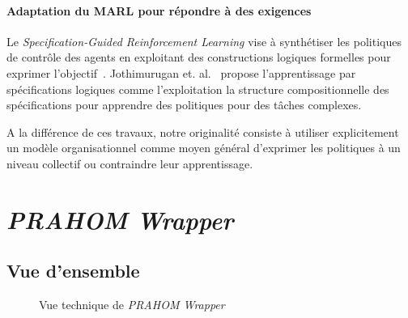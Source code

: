 \documentclass[demonstration]{jfsma}
\begin{document}
\paragraph{\textbf{Adaptation du MARL pour répondre à des exigences}}
%
%
Le \emph{Specification-Guided Reinforcement Learning} vise à synthétiser les politiques de contrôle des agents en exploitant des constructions logiques formelles pour exprimer l'objectif~\cite{Bansal2022}.%
%
Jothimurugan et. al.~\cite{Jothimurugan2021} propose l'apprentissage par spécifications logiques comme l'exploitation la structure compositionnelle des spécifications pour apprendre des politiques pour des tâches complexes.

A la différence de ces travaux, notre originalité consiste à utiliser explicitement un modèle organisationnel comme moyen général d'exprimer les politiques à un niveau collectif ou contraindre leur apprentissage. %



\section{\emph{PRAHOM Wrapper}}

\subsection{Vue d'ensemble}

\begin{figure}[h!]
  \centering
  
  \caption{Vue technique de \emph{PRAHOM Wrapper}}
  \label{fig:prahom_wrapper_technical_view}
\end{figure}
\end{document}
